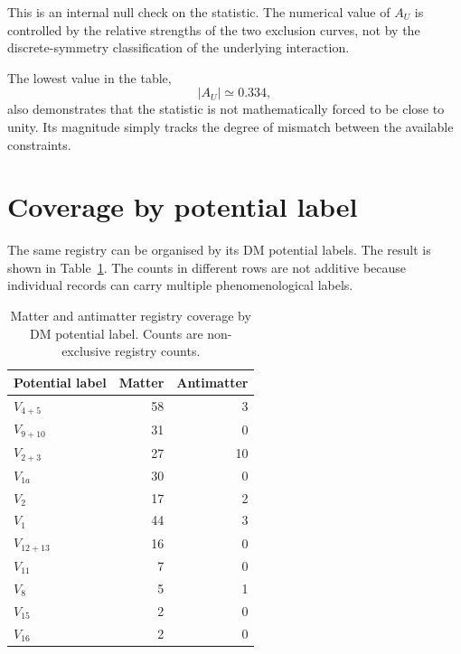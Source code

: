 \documentclass[aps,prd,reprint,superscriptaddress,nofootinbib]{revtex4-2}
\begin{document}
	This is an internal null check on the statistic. The numerical value of
	$A_U$ is controlled by the relative strengths of the two exclusion
	curves, not by the discrete-symmetry classification of the underlying
	interaction.
	
	The lowest value in the table,
	\begin{equation}
		|A_U|\simeq0.334,
	\end{equation}
	also demonstrates that the statistic is not mathematically forced to
	be close to unity. Its magnitude simply tracks the degree of mismatch
	between the available constraints.
	
	\section{Coverage by potential label}
	
	The same registry can be organised by its DM potential labels. The
	result is shown in Table~\ref{tab:potentialcoverage}. The counts in
	different rows are not additive because individual records can carry
	multiple phenomenological labels.
	
	\begin{table}[t]
		\caption{Matter and antimatter registry coverage by DM potential label.
			Counts are non-exclusive registry counts.}
		\label{tab:potentialcoverage}
		\begin{ruledtabular}
			\begin{tabular}{lrr}
				Potential label & Matter & Antimatter\\
				\hline
				$V_{4+5}$ & 58 & 3\\
				$V_{9+10}$ & 31 & 0\\
				$V_{2+3}$ & 27 & 10\\
				$V_{1a}$ & 30 & 0\\
				$V_2$ & 17 & 2\\
				$V_1$ & 44 & 3\\
				$V_{12+13}$ & 16 & 0\\
				$V_{11}$ & 7 & 0\\
				$V_8$ & 5 & 1\\
				$V_{15}$ & 2 & 0\\
				$V_{16}$ & 2 & 0
			\end{tabular}
		\end{ruledtabular}
	\end{table}
	
\end{document}
